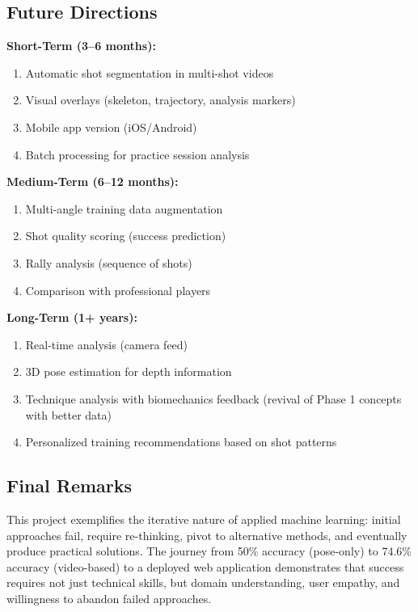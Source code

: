 \documentclass[12pt,a4paper]{article}
\begin{document}
\subsection{Future Directions}

\textbf{Short-Term (3--6 months):}
\begin{enumerate}
\item Automatic shot segmentation in multi-shot videos
\item Visual overlays (skeleton, trajectory, analysis markers)
\item Mobile app version (iOS/Android)
\item Batch processing for practice session analysis
\end{enumerate}

\textbf{Medium-Term (6--12 months):}
\begin{enumerate}
\item Multi-angle training data augmentation
\item Shot quality scoring (success prediction)
\item Rally analysis (sequence of shots)
\item Comparison with professional players
\end{enumerate}

\textbf{Long-Term (1+ years):}
\begin{enumerate}
\item Real-time analysis (camera feed)
\item 3D pose estimation for depth information
\item Technique analysis with biomechanics feedback (revival of Phase 1 concepts with better data)
\item Personalized training recommendations based on shot patterns
\end{enumerate}

\subsection{Final Remarks}

This project exemplifies the iterative nature of applied machine learning: initial approaches fail, require re-thinking, pivot to alternative methods, and eventually produce practical solutions. The journey from 50\% accuracy (pose-only) to 74.6\% accuracy (video-based) to a deployed web application demonstrates that success requires not just technical skills, but domain understanding, user empathy, and willingness to abandon failed approaches.
\end{document}
